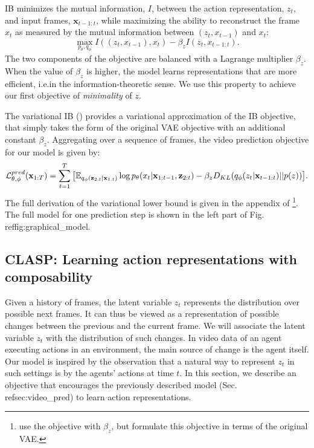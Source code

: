 \documentclass{article} %
\begin{document}
IB minimizes the mutual information, $I$, between the action  representation, $z_{t}$, and input frames, $\mathbf{x}_{t-1:t}$, while maximizing the ability to reconstruct the frame $x_t$ as measured by the mutual information between $(z_t, x_{t-1})$ and $x_t$: 
\begin{equation} \max_{p_\theta,q_{\phi}} I((z_t, x_{t-1}),x_t) - \beta_z I(z_t, x_{t-1:t}).
\end{equation}
The two components of the objective are balanced with a Lagrange multiplier $\beta_z$. When the value of $\beta_z$ is higher, the model learns representations that are more efficient, i.e.\minimal in the information-theoretic sense. We use this property to achieve our first objective of \textit{minimality} of $z$. 

The variational IB (\cite{alemi2016deep}) provides a variational approximation of the IB objective, that simply takes the form of the original VAE objective with an additional constant $\beta_z$. Aggregating over a sequence of frames, the video prediction objective for our model is given by:
\begin{equation} \mathcal{L}_{\theta,\phi}^{pred}(\mathbf{x}_{1:T}) = \sum_{t=1}^T \big{[} \mathbb{E}_{q_{\phi}(\mathbf{z}_{2:t} | \mathbf{x}_{1:t})} \log p_{\theta}(x_t | \mathbf{x}_{1:t-1}, \mathbf{z}_{2:t})  - \beta_z D_{KL}(q_{\phi}(z_t | \mathbf{x}_{t-1:t}) || p(z))\big{]}.
\end{equation}
The full derivation of the variational lower bound is given in the appendix of \cite{denton18stochastic}\footnote{\cite{denton18stochastic} use the objective with $\beta_z$, but formulate this objective in terms of the original VAE. %
}. The full model for one prediction step is shown in the left part of Fig.\\ref{fig:graphical_model}.


\subsection{CLASP: Learning action representations with composability}
\label{sec:composability}


Given a history of frames, the latent variable $z_t$ represents the distribution over possible next frames. It can thus be viewed as a representation of possible changes between the previous and the current frame. We will associate the latent variable $z_t$ with the distribution of such changes. 
In video data of an agent executing actions in an environment, the main source of change is the agent itself. Our model is inspired by the observation that a natural way to represent $z_t$ in such settings is by
the agents’ actions at time $t$. In this section, we describe an objective that encourages the previously described model (Sec.\\ref{sec:video_pred}) to learn action representations.
\end{document}
